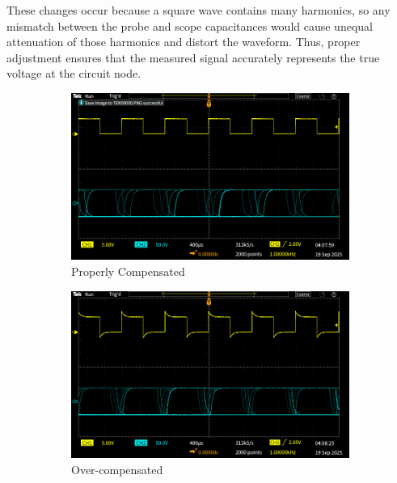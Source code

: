 \documentclass{article}
\begin{document}
\noindent These changes occur because a square wave contains many harmonics,
so any mismatch between the probe and scope capacitances would cause unequal
attenuation of those harmonics and distort the waveform. Thus, proper adjustment
ensures that the measured signal accurately represents the true voltage at the
circuit node.

\begin{figure}[H]
    \centering
    \begin{subfigure}[t]{0.32\textwidth}
        \includegraphics[width=\linewidth]{4.1a.full.png}
        \caption{Properly Compensated}
        \label{fig:full}
    \end{subfigure}
    \hfill
    \begin{subfigure}[t]{0.32\textwidth}
        \includegraphics[width=\linewidth]{4.1a.side1.png}
        \caption{Over-compensated}
        \label{fig:over}
    \end{subfigure}
    \hfill
    \begin{subfigure}[t]{0.32\textwidth}

\end{subfigure}
\end{figure}
\end{document}
